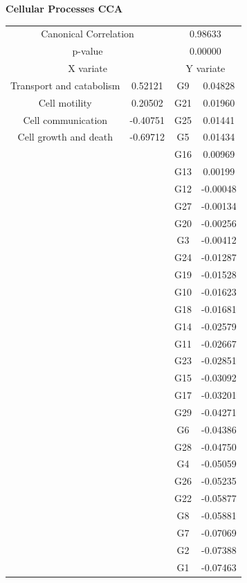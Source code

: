 \begin{figure}
  \begin{subfigure}{.65\textwidth}
  \centering
  \textbf{Cellular Processes CCA}\par\medskip
  \begin{tabular}{ c c | c c }
    \multicolumn{2}{c}{Canonical Correlation} &  \multicolumn{2}{c}{0.98633} \\
    \multicolumn{2}{c}{p-value} &  \multicolumn{2}{c}{0.00000} \\
    \hline
    \multicolumn{2}{c}{X variate} & \multicolumn{2}{c}{Y variate}\\
    \hline
  Transport and catabolism & 0.52121 &  G9 & 0.04828\\
  Cell motility & 0.20502 &  G21 & 0.01960\\
  Cell communication & -0.40751 &  G25 & 0.01441\\
  Cell growth and death & -0.69712 &  G5 & 0.01434\\
  & &  G16 & 0.00969\\
  & &  G13 & 0.00199\\
  & &  G12 & -0.00048\\
  & &  G27 & -0.00134\\
  & &  G20 & -0.00256\\
  & &  G3 & -0.00412\\
  & &  G24 & -0.01287\\
  & &  G19 & -0.01528\\
  & &  G10 & -0.01623\\
  & &  G18 & -0.01681\\
  & &  G14 & -0.02579\\
  & &  G11 & -0.02667\\
  & &  G23 & -0.02851\\
  & &  G15 & -0.03092\\
  & &  G17 & -0.03201\\
  & &  G29 & -0.04271\\
  & &  G6 & -0.04386\\
  & &  G28 & -0.04750\\
  & &  G4 & -0.05059\\
  & &  G26 & -0.05235\\
  & &  G22 & -0.05877\\
  & &  G8 & -0.05881\\
  & &  G7 & -0.07069\\
  & &  G2 & -0.07388\\
  & &  G1 & -0.07463\\
  \end{tabular}


\end{subfigure}
\end{figure}
